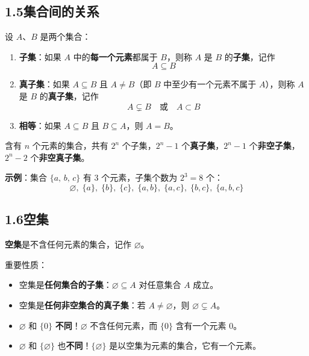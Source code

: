 \documentclass[12pt, a4paper]{ctexart}
\begin{document}
\subsection*{1.5\quad 集合间的关系}

\begin{knowledgebox}[子集、真子集与相等]
设 $A$、$B$ 是两个集合：
\begin{enumerate}[leftmargin=2.5em]
  \item \textbf{子集}：如果 $A$ 中的\textbf{每一个元素}都属于 $B$，则称 $A$ 是 $B$ 的\textbf{子集}，记作
  \[ A \subseteq B \]
  \item \textbf{真子集}：如果 $A \subseteq B$ 且 $A \neq B$（即 $B$ 中至少有一个元素不属于 $A$），则称 $A$ 是 $B$ 的\textbf{真子集}，记作
  \[ A \subsetneq B \quad\text{或}\quad A \subset B \]
  \item \textbf{相等}：如果 $A \subseteq B$ 且 $B \subseteq A$，则 $A = B$。
\end{enumerate}
\end{knowledgebox}

\begin{tipbox}[子集个数公式]
含有 $n$ 个元素的集合，共有 $2^n$ 个子集，$2^n - 1$ 个\textbf{真子集}，$2^n - 1$ 个\textbf{非空子集}，$2^n - 2$ 个\textbf{非空真子集}。

\textbf{示例}：集合 $\{a,\, b,\, c\}$ 有 $3$ 个元素，子集个数为 $2^3 = 8$ 个：
\[
\varnothing,\; \{a\},\; \{b\},\; \{c\},\; \{a,b\},\; \{a,c\},\; \{b,c\},\; \{a,b,c\}
\]
\end{tipbox}

\subsection*{1.6\quad 空集}

\begin{knowledgebox}[空集 $\varnothing$]
\textbf{空集}是不含任何元素的集合，记作 $\varnothing$。

重要性质：
\begin{itemize}[leftmargin=2em]
  \item 空集是\textbf{任何集合的子集}：$\varnothing \subseteq A$ 对任意集合 $A$ 成立。
  \item 空集是\textbf{任何非空集合的真子集}：若 $A \neq \varnothing$，则 $\varnothing \subsetneq A$。
\end{itemize}
\end{knowledgebox}

\begin{warnbox}[易错提醒]
\begin{itemize}[leftmargin=2em]
  \item $\varnothing$ 和 $\{0\}$ \textbf{不同}！$\varnothing$ 不含任何元素，而 $\{0\}$ 含有一个元素 $0$。
  \item $\varnothing$ 和 $\{\varnothing\}$ 也\textbf{不同}！$\{\varnothing\}$ 是以空集为元素的集合，它有一个元素。
\end{itemize}
\end{warnbox}
\end{document}
